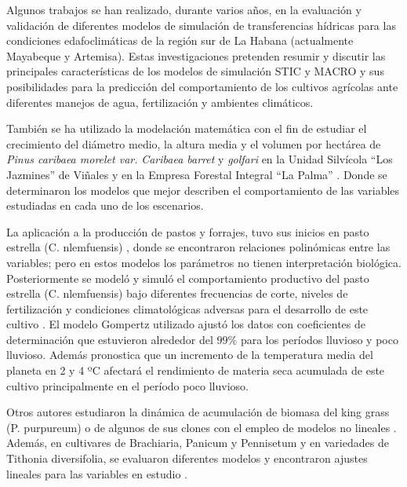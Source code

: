 Algunos trabajos se han realizado, durante varios años, en la evaluación y validación de diferentes modelos de simulación de transferencias hídricas para las condiciones edafoclimáticas de la región sur de La Habana (actualmente Mayabeque y Artemisa). Estas investigaciones pretenden resumir y discutir las principales características de los modelos de simulación STIC y MACRO y sus posibilidades para la predicción del comportamiento de los cultivos agrícolas ante diferentes manejos de agua, fertilización y ambientes climáticos. \parencite{lopez20143, robaina2013crop, rodriguez2018aplicaciones}

También se ha utilizado la modelación matemática con el fin de estudiar el crecimiento del diámetro medio, la altura media y el volumen por hectárea de \textit{Pinus caribaea morelet var.}
\textit{Caribaea barret} y \textit{golfari }en la Unidad Silvícola “Los Jazmines” de Viñales y en la Empresa Forestal Integral “La Palma” \parencite{suarez2011modelacion, sarria2013modelacion}. Donde se determinaron los modelos que mejor describen el comportamiento de las variables estudiadas en cada uno de los escenarios. \parencite{rodriguez2018aplicaciones}

La aplicación a la producción de pastos y forrajes, tuvo sus inicios en pasto estrella (C. nlemfuensis) \parencite{del1998analisis, torres1999empleo}, donde se encontraron relaciones polinómicas entre las variables; pero en estos modelos los parámetros no tienen interpretación biológica. Posteriormente se modeló y simuló el comportamiento productivo del pasto estrella (C. nlemfuensis) bajo diferentes frecuencias de corte, niveles de fertilización y condiciones climatológicas adversas para el desarrollo de este cultivo \parencite{rodriguez2020modelacion}. El modelo Gompertz utilizado ajustó los datos con coeficientes de determinación que estuvieron alrededor del $99 \% $ para los períodos lluvioso y poco lluvioso. Además pronostica que un incremento de la temperatura media del planeta en 2 y 4 ºC afectará el rendimiento de materia seca acumulada de este cultivo principalmente en el período poco lluvioso. \parencite{rodriguez2018aplicaciones}

Otros autores estudiaron la dinámica de acumulación de biomasa del king grass (P. purpureum) o de algunos de sus clones con el empleo de modelos no lineales \parencite{diaz2007evaluacion, noda2013modelacion}. Además, en cultivares de Brachiaria, Panicum y Pennisetum y en variedades de Tithonia diversifolia, se evaluaron diferentes modelos y encontraron ajustes lineales para las variables en estudio \parencite{ramirez2012rendimiento, torres2012utilizacion, rodriguez2018aplicaciones}.

